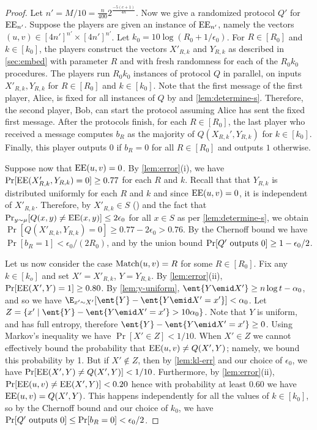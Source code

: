 \begin{proof}
Let $n' = M/10 = \frac{n}{400}2^{\frac{-5(c+1)}{4n}}$. Now we
give a randomized protocol $Q'$ for $\operatorname{EE}_{n'}$. Suppose the
players are given an instance of $\operatorname{EE}_{n'}$, namely the vectors
$(u,v)\in[4n']^{n'}\times[4n']^{n'}$. Let $k_0 = 10\log (R_0 +
1/\epsilon_0)$. For $R\in[R_0]$ and $k\in [k_0]$, the players
construct the vectors $X'_{R,k}$ and $Y_{R,k}$ as described in
\autoref{sec:embed} with parameter $R$ and with fresh randomness
for each of the $R_0k_0$ procedures. The players run $R_0 k_0$
instances of protocol $Q$ in parallel, on inputs $X'_{R,k},
Y_{R,k}$ for $R\in[R_0]$ and $k\in[k_0]$. Note that the first
message of the first player, Alice, is fixed for all instances
of $Q$ by  and \autoref{lem:determine-s}.
Therefore, the second player, Bob, can start the protocol
assuming Alice has sent the fixed first message. After the
protocols finish, for each $R\in[R_0]$, the last player who
received a message computes $b_R$ as the majority of
$Q(X_{R,k}',Y_{R,k})$ for $k\in [k_0]$. Finally, this player
outputs $0$ if $b_R=0$ for all $R\in[R_0]$ and outputs $1$
otherwise.

Suppose now that $\operatorname{EE}(u,v) = 0$. By \autoref{lem:error}(i), we
have $\Pr[\operatorname{EE}(X'_{R,k},Y_{R,k}) = 0] \ge 0.77$ for each $R$ and
$k$. Recall that that $Y_{R,k}$ is distributed uniformly for
each $R$ and $k$ and since $\operatorname{EE}(u,v)=0$, it is independent of
$X'_{R,k}$. Therefore, by $X'_{R,k}\in S$ () and
the fact that $\Pr_{y\sim \mu}[Q(x,y)\neq\operatorname{EE}(x,y)]\leq
2\epsilon_0$ for all $x\in S$ as per \autoref{lem:determine-s},
we obtain $\Pr[Q(X'_{R,k},Y_{R,k}) = 0] \ge 0.77 - 2\epsilon_0 >
0.76$. By the Chernoff bound we have $\Pr[b_R = 1] <
\epsilon_0/(2R_0)$, and by the union bound $\Pr[Q'\hbox{ outputs
}0]\ge1-\epsilon_0 /2$.

Let us now consider the case $\operatorname{Match}(u,v) = R$ for some
$R\in[R_0]$. Fix any $k\in[k_o]$ and set $X'=X'_{R,k}$,
$Y=Y_{R,k}$. By \autoref{lem:error}(ii), $\Pr[\operatorname{EE}(X',Y) = 1]\ge
0.80$. By \autoref{lem:y-uniform}, $\ent{Y\emid X'}\geq n\log t
-\alpha_0$, and so we have $\E_{x'\sim X'}[\ent{Y} - \ent{Y\emid
X'=x'}] < \alpha_0$. Let $Z=\{x'\mid\ent{Y} - \ent{Y\emid X'=x'}
> 10\alpha_0\}$. Note that $Y$ is uniform, and has full entropy,
therefore $\ent{Y} - \ent{Y\emid X'=x'} \geq 0$. Using Markov's
inequality we have $\Pr[X'\in Z]<1/10$. When $X'\in Z$ we cannot
effectively bound the probability that $\operatorname{EE}(u,v)\neq Q(X', Y)$;
namely, we bound this probability by 1. But if $X'\notin Z$,
then by \autoref{lem:kl-err} and our choice of $\epsilon_0$, we
have $\Pr[\operatorname{EE}(X', Y)\neq Q(X', Y)] < 1/10$. Furthermore, by
\autoref{lem:error}(ii), $\Pr[\operatorname{EE}(u,v) \neq \operatorname{EE}(X', Y)]< 0.20$
hence with probability at least $0.60$ we have $\operatorname{EE}(u,v) = Q(X',
Y)$. This happens independently for all the values of
$k\in[k_0]$, so by the Chernoff bound and our choice of $k_0$,
we have $\Pr[Q'\hbox{ outputs }0]\le\Pr[b_R = 0] < \epsilon_0 /
2$.


\end{proof}
